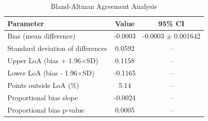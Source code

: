 
\begin{table}[h]
\centering
\caption{Bland-Altman Agreement Analysis}
\label{tab:bland_altman}
\begin{tabular}{lcc}
\hline
\textbf{Parameter} & \textbf{Value} & \textbf{95\% CI} \\
\hline
Bias (mean difference) & -0.0003 & -0.0003 $\pm$ 0.001642 \\
Standard deviation of differences & 0.0592 & -- \\
Upper LoA (bias + 1.96$\times$SD) & 0.1158 & -- \\
Lower LoA (bias - 1.96$\times$SD) & -0.1165 & -- \\
Points outside LoA (\%) & 5.14 & -- \\
Proportional bias slope & -0.0024 & -- \\
Proportional bias p-value & 0.0005 & -- \\
\hline
\end{tabular}
\end{table}
